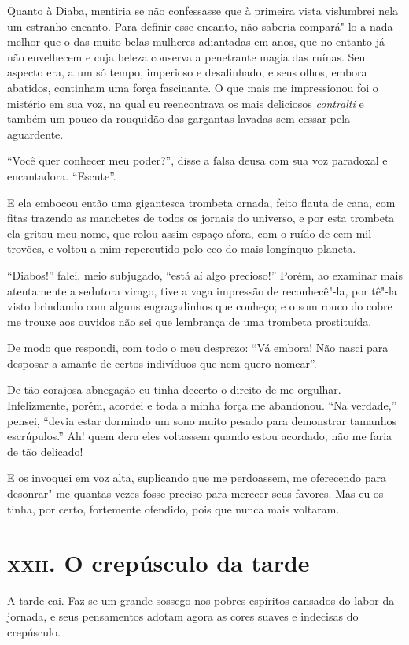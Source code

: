 Quanto à Diaba, mentiria se não confessasse que à primeira vista
vislumbrei nela um estranho encanto. Para definir esse encanto, não
saberia compará"-lo a nada melhor que o das muito belas
mulheres adiantadas em anos, que no entanto já não envelhecem e cuja beleza
conserva a penetrante magia das ruínas. Seu aspecto era, a um só tempo,
imperioso e desalinhado, e seus olhos, embora abatidos, continham
uma força fascinante. O que mais me impressionou foi o mistério em sua voz,
na qual eu reencontrava os mais deliciosos \textit{contralti} e
também um pouco da rouquidão das gargantas lavadas sem cessar pela
aguardente.

``Você quer conhecer meu poder?'', disse a
falsa deusa com sua voz paradoxal e encantadora.
“Escute”.

E ela embocou então uma gigantesca trombeta ornada, feito flauta de
cana, com fitas trazendo as manchetes de todos os jornais do universo, e
por esta trombeta ela gritou meu nome, que rolou assim
espaço afora, com o ruído de cem mil trovões, e voltou a mim repercutido pelo
eco do mais longínquo planeta.

``Diabos!'' falei, meio subjugado, ``está aí algo precioso!'' Porém, ao examinar
mais atentamente a sedutora virago, tive a vaga impressão de
reconhecê"-la, por tê"-la visto brindando com alguns engraçadinhos
que conheço; e o som rouco do cobre me trouxe aos ouvidos não
sei que lembrança de uma trombeta prostituída.

De modo que respondi, com todo o meu desprezo: ``Vá embora! Não
nasci para desposar a amante de certos indivíduos que nem quero
nomear''.

De tão corajosa abnegação eu tinha decerto o direito de me orgulhar.
Infelizmente, porém, acordei e toda a minha força me abandonou.
``Na verdade,'' pensei, ``devia estar
dormindo um sono muito pesado para demonstrar tamanhos escrúpulos.'' Ah! quem dera
eles voltassem quando estou acordado, não me faria de tão
delicado!

E os invoquei em voz alta, suplicando que me perdoassem, me
oferecendo para desonrar"-me quantas vezes fosse preciso para merecer
seus favores. Mas eu os tinha, por certo, fortemente ofendido, pois que
nunca mais voltaram.

\chapter{\textsc{xxii.} O crepúsculo da tarde}

A tarde cai. Faz-se um grande sossego nos pobres espíritos
cansados do labor da jornada, e seus pensamentos adotam agora as cores
suaves e indecisas do crepúsculo.

